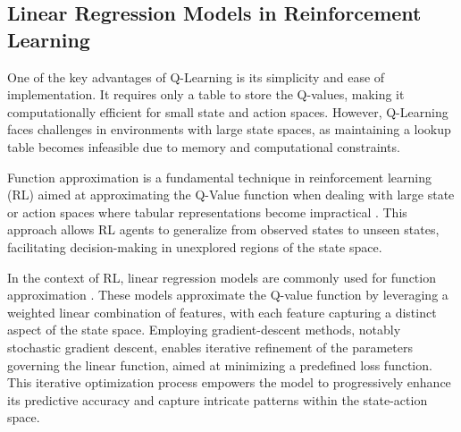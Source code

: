 


\subsection{Linear Regression Models in Reinforcement Learning}

One of the key advantages of Q-Learning is its simplicity and ease of implementation. It requires only a table to store the Q-values, making it computationally efficient for small state and action spaces. However, Q-Learning faces challenges in environments with large state spaces, as maintaining a lookup table becomes infeasible due to memory and computational constraints.

Function approximation is a fundamental technique in reinforcement learning (RL) aimed at approximating the Q-Value function when dealing with large state or action spaces where tabular representations become impractical \cite{russel2020ai}. This approach allows RL agents to generalize from observed states to unseen states, facilitating decision-making in unexplored regions of the state space.

In the context of RL, linear regression models are commonly used for function approximation \cite{sutton2018reinforcement}.  These models approximate the Q-value function by leveraging a weighted linear combination of features, with each feature capturing a distinct aspect of the state space. Employing gradient-descent methods, notably stochastic gradient descent, enables iterative refinement of the parameters governing the linear function, aimed at minimizing a predefined loss function. This iterative optimization process empowers the model to progressively enhance its predictive accuracy and capture intricate patterns within the state-action space.

